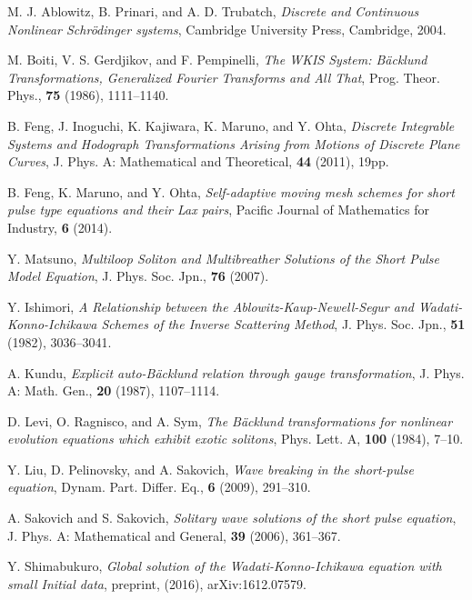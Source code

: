 \documentclass[11pt]{article}
\begin{document}
\begin{thebibliography}{10}
M. J. Ablowitz, B. Prinari, and A. D. Trubatch, \emph{Discrete and Continuous Nonlinear Schr\"{o}dinger systems}, Cambridge University Press, Cambridge, 2004.

 M. Boiti, V. S. Gerdjikov, and F. Pempinelli,
\emph{The WKIS  System: B\"{a}cklund Transformations, Generalized Fourier Transforms and All That},
Prog. Theor. Phys., {\bf 75} (1986), 1111--1140.

 B. Feng, J. Inoguchi, K. Kajiwara, K. Maruno, and Y. Ohta,
\emph{Discrete Integrable Systems and Hodograph Transformations Arising from Motions of Discrete Plane Curves},
J. Phys. A: Mathematical and Theoretical, {\bf 44} (2011), 19pp.

 B. Feng, K. Maruno, and Y. Ohta,
\emph{Self-adaptive moving mesh schemes for short pulse type equations and their Lax pairs},
Pacific Journal of Mathematics for Industry, {\bf 6} (2014).

 Y. Matsuno, 
\emph{Multiloop Soliton and Multibreather Solutions of the Short Pulse Model Equation},
J. Phys. Soc. Jpn., {\bf 76} (2007).

 Y. Ishimori, 
\emph{A Relationship between the Ablowitz-Kaup-Newell-Segur and Wadati-Konno-Ichikawa Schemes of the Inverse Scattering Method},
J. Phys. Soc. Jpn., {\bf 51} (1982), 3036--3041.

 A. Kundu, 
\emph{Explicit auto-B\"{a}cklund relation through gauge transformation},
J. Phys. A: Math. Gen., {\bf 20} (1987), 1107--1114.

 D. Levi, O. Ragnisco, and A. Sym,
\emph{The B\"{a}cklund transformations for nonlinear evolution equations which exhibit exotic solitons},
Phys. Lett. A, {\bf 100} (1984), 7--10.

 Y. Liu, D. Pelinovsky, and A. Sakovich, 
\emph{Wave breaking in the short-pulse equation},
Dynam. Part. Differ. Eq., {\bf 6} (2009), 291--310.

  A. Sakovich and S. Sakovich,
\emph{Solitary wave solutions of the short pulse equation},
J. Phys. A: Mathematical and General, {\bf 39} (2006), 361--367.

 Y. Shimabukuro, 
\emph{Global solution of the Wadati-Konno-Ichikawa equation with small Initial data}, preprint, (2016), arXiv:1612.07579. 


\end{thebibliography}
\end{document}
